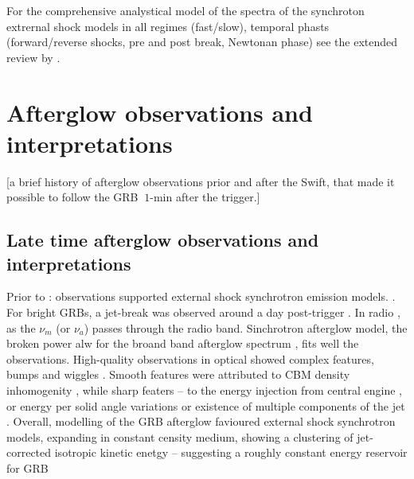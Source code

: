 For the comprehensive analystical model of the spectra of the synchroton extrernal shock models in all regimes (fast/slow), temporal phasts (forward/reverse shocks, pre and post break, Newtonan phase) see the extended review by \cite{Gao et al. (2013b)}.


\section{Afterglow observations and interpretations}

[a brief history of afterglow observations prior and after the Swift, that made it possible to follow the GRB $~1$-min after the trigger.]

\subsection{Late time afterglow observations and interpretations}

Prior to : observations supported external shock synchrotron emission models.
\cite{(e.g. Meszaros and Rees, 1997a; Sari et al., 1998; Panaitescu and Kumar, 2001, 2002; Yost et al., 2003),}. For bright GRBs, a jet-break was observed around a day post-trigger \cite{(e.g. Rhoads, 1999; Sari et al., 1999}.
In radio , \cite{e.g. Frail et al., 2000} as the $\nu_m$ (or $\nu_a$) passes through the radio band.
Sinchrotron afterglow model, the broken power alw for the broand band afterglow spectrum \cite{Wijers and Galama, 1999; Harrison et al., 1999}, fits well the observations.
High-quality observations in optical showed complex features, bumps and wiggles \cite{e.g. Holland et al., 2003; Lipkin et al., 2004}. Smooth features were attributed to CBM density inhomogenity \cite{(Lazzati et al., 2002; Dai and Wu, 2003; Nakar and Granot, 2007}, while sharp featers -- to the energy injection from central engine \cite{Katz et al., 1998; Kumar and Piran, 2000b; Zhang and Meszaros, 2002c; Granot et al., 2003}, or energy per solid angle variations \cite{(Kumar and Piran, 2000a; Yamazaki et al., 2004a} or existence of multiple components of the jet \cite{Berger et al., 2003a; Huang et al., 2004; Racusin et al., 2008}.
Overall, modelling of the GRB afterglow \cite{e.g., Panaitescu and Kumar (2001, 2002); Yost et al. (2003)} favioured external shock synchrotron models, expanding in constant censity medium, showing a clustering of jet-corrected isotropic kinetic enetgy \cite{Frail et al., 2001; Bloom et al., 2003),} -- suggesting a roughly constant energy reservoir for GRB


